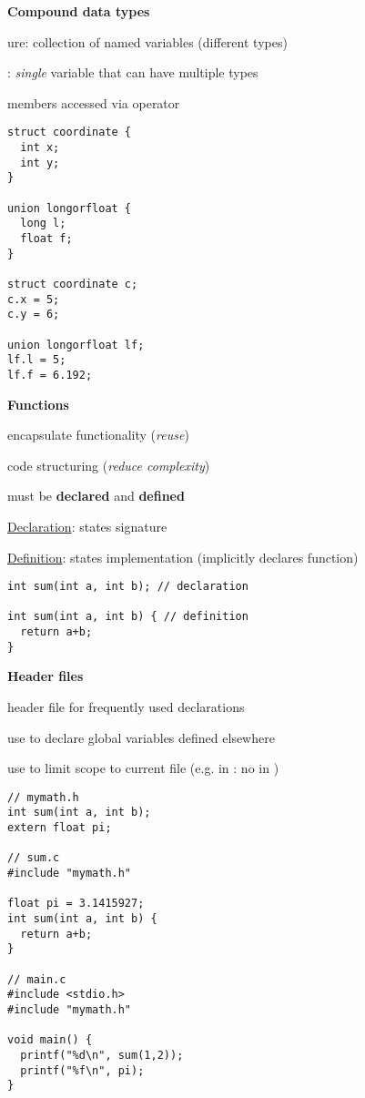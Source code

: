 \textbf{Compound data types}
\begin{items}
  \item {}ure: collection of named variables (different types)
  \item {}: \emph{single} variable that can have multiple types
  \item members accessed via  operator
\end{items}
\begin{lstlisting}[style=customc]
struct coordinate {
  int x;
  int y;
}

union longorfloat {
  long l;
  float f;
}

struct coordinate c;
c.x = 5;
c.y = 6;

union longorfloat lf;
lf.l = 5;
lf.f = 6.192;
\end{lstlisting}

\newpage

\textbf{Functions}
\begin{items}
  \item encapsulate functionality (\emph{reuse})
  \item code structuring (\emph{reduce complexity})
  \item must be \textbf{declared} and \textbf{defined}
  \item \underline{Declaration}: states signature
  \item \underline{Definition}: states implementation (implicitly declares function)
\end{items}
\begin{lstlisting}[style=customc]
int sum(int a, int b); // declaration

int sum(int a, int b) { // definition
  return a+b;
}
\end{lstlisting}

\textbf{Header files}
\begin{items}
  \item header file for frequently used declarations
  \item use  to declare global variables defined elsewhere
  \item use  to limit scope to current file (e.g.  in : no  in )
  \begin{lstlisting}[style=customc]
// mymath.h
int sum(int a, int b);
extern float pi;

// sum.c
#include "mymath.h"

float pi = 3.1415927;
int sum(int a, int b) {
  return a+b;
}

// main.c
#include <stdio.h>
#include "mymath.h"

void main() {
  printf("%d\n", sum(1,2));
  printf("%f\n", pi);
}
  \end{lstlisting}
\end{items}

